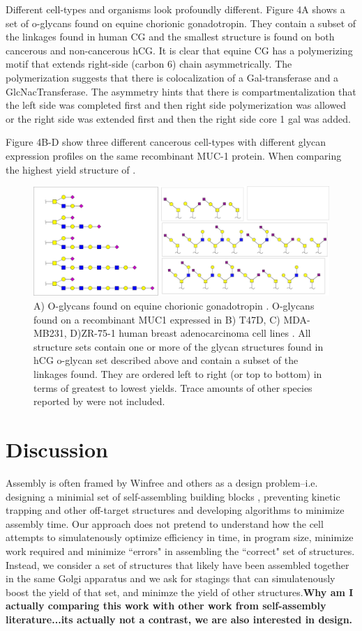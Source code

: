 \documentclass[twocolumn]{article}
\begin{document}
Different cell-types and organisms look profoundly different. Figure 4A shows a set of o-glycans found on equine chorionic gonadotropin. They contain a subset of the linkages found in human CG and the smallest structure is found on both cancerous and non-cancerous hCG. It is clear that equine CG has a polymerizing motif that extends right-side (carbon 6) chain asymmetrically. The polymerization suggests that there is colocalization of a Gal-transferase and a GlcNacTransferase. The asymmetry hints that there is compartmentalization that the left side was completed first and then right side polymerization was allowed or the right side was extended first and then the right side core 1 gal was added. 

Figure 4B-D show three different cancerous cell-types with different glycan expression profiles on the same recombinant MUC-1 protein. When comparing the highest yield structure of . 


\begin{figure}[t]
    \includegraphics[width=\textwidth]{Figure_6.pdf}
	\caption{A) O-glycans found on equine chorionic gonadotropin \cite{Hokke1994}. O-glycans found on a recombinant MUC1 expressed in B) T47D, C) MDA-MB231, D)ZR-75-1 human breast adenocarcinoma cell lines \cite{Muller2002}. All structure sets contain one or more of the glycan structures found in hCG o-glycan set described above and contain a subset of the linkages found. They are ordered left to right (or top to bottom) in terms of greatest to lowest yields. Trace amounts of other species reported by \cite{Muller2002} were not included.}
\end{figure}


\section*{Discussion}
Assembly is often framed by Winfree and others as a design problem--i.e. designing a minimial set of self-assembling building blocks \cite{Rothemund2000}, preventing kinetic trapping \cite{Fujibayashi2009, Winfree2004} and other off-target structures and developing algorithms to minimize assembly time. Our approach does not pretend to understand how the cell attempts to simulatenously optimize efficiency in time, in program size, minimize work required and minimize ``errors" in assembling the ``correct" set of structures. Instead, we consider a set of structures that likely have been assembled together in the same Golgi apparatus and we ask for stagings that can simulatenously boost the yield of that set, and minimze the yield of other structures.\textbf{Why am I actually comparing this work with other work from self-assembly literature...its actually not a contrast, we are also interested in design.} 
\end{document}
